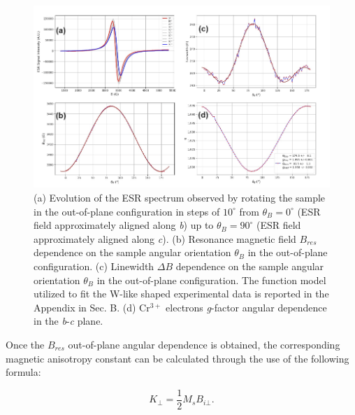 \documentclass[journal]{IEEEtran}
\begin{document}
\begin{figure}[h!]
    \centering
    \includegraphics[width=\linewidth]{Lab2-Resonance.png}
    \caption{(a) Evolution of the ESR spectrum observed by rotating the sample in the out-of-plane configuration in steps of $10^{\circ}$ from $\theta_B=0^{\circ}$ (ESR field approximately aligned along \textit{b}) up to $\theta_B=90^{\circ}$ (ESR field approximately aligned along \textit{c}). 
    (b) Resonance magnetic field $B_{res}$ dependence on the sample angular orientation $\theta_B$ in the out-of-plane configuration.
    (c) Linewidth $\Delta B$ dependence on the sample angular orientation $\theta_B$ in the out-of-plane configuration. The function model utilized to fit the W-like shaped experimental data is reported in the Appendix in Sec. B.
    (d) Cr$^{3+}$ electrons \textit{g}-factor angular dependence in the \textit{b}-\textit{c} plane.}
    \label{fig:ESR_Results}
\end{figure}

\noindent Once the $B_{res}$ out-of-plane angular dependence is obtained, the corresponding magnetic anisotropy constant can be calculated through the use of the following formula:

\begin{equation}
    K_{\bot} = \frac{1}{2}M_sB_{i\bot}.
    \label{eq:AnisotropyConstant}
\end{equation}
\end{document}
